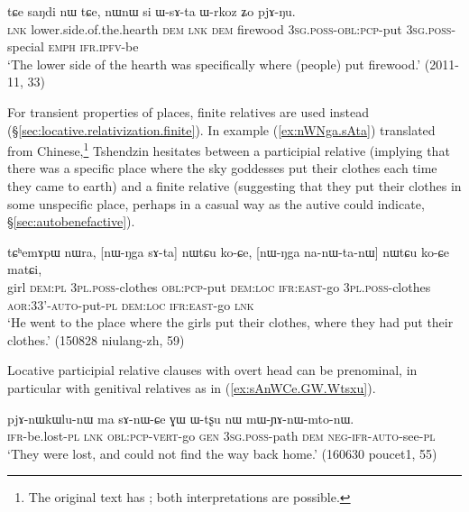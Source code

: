 \begin{exe}
\ex \label{ex:WsAta.Wrkoz}
\gll tɕe saŋdi nɯ tɕe, nɯnɯ si ɯ-sɤ-ta ɯ-rkoz ʑo pjɤ-ŋu. \\
  \textsc{lnk} lower.side.of.the.hearth \textsc{dem} \textsc{lnk} \textsc{dem} firewood \textsc{3sg}.\textsc{poss}-\textsc{obl}:\textsc{pcp}-put \textsc{3sg}.\textsc{poss}-special \textsc{emph} \textsc{ifr}.\textsc{ipfv}-be \\
\glt `The lower side of the hearth was specifically where (people) put firewood.' (2011-11, 33)
\end{exe}


For transient properties of places, finite relatives are used instead (§\ref{sec:locative.relativization.finite}). In example (\ref{ex:nWNga.sAta}) translated from Chinese,\footnote{The original text has ; both interpretations are possible. }  Tshendzin hesitates between a participial relative (implying that there was a specific place where the sky goddesses put their clothes each time they came to earth) and a finite relative (suggesting that they put their clothes in some unspecific place, perhaps in a casual way as the autive  could indicate, §\ref{sec:autobenefactive}).

\begin{exe}
\ex \label{ex:nWNga.sAta}
\gll tɕʰemɤpɯ nɯra, [nɯ-ŋga sɤ-ta] nɯtɕu ko-ɕe, [nɯ-ŋga na-nɯ-ta-nɯ] nɯtɕu ko-ɕe matɕi, \\
girl \textsc{dem}:\textsc{pl} \textsc{3pl}.\textsc{poss}-clothes \textsc{obl}:\textsc{pcp}-put \textsc{dem}:\textsc{loc} \textsc{ifr}:\textsc{east}-go \textsc{3pl}.\textsc{poss}-clothes \textsc{aor}:3\fl{}3'-\textsc{auto}-put-\textsc{pl} \textsc{dem}:\textsc{loc} \textsc{ifr}:\textsc{east}-go \textsc{lnk} \\
\glt `He went to the place where the girls put their clothes, where they had put their clothes.' (150828 niulang-zh, 59)
\end{exe}

Locative participial relative clauses with overt head can be prenominal, in particular with genitival relatives as in (\ref{ex:sAnWCe.GW.Wtsxu}). 

\begin{exe}
\ex \label{ex:sAnWCe.GW.Wtsxu}
\gll  pjɤ-nɯkɯlu-nɯ ma sɤ-nɯ-ɕe ɣɯ ɯ-tʂu nɯ mɯ-ɲɤ-nɯ-mto-nɯ. \\
\textsc{ifr}-be.lost-\textsc{pl}  \textsc{lnk} \textsc{obl}:\textsc{pcp}-\textsc{vert}-go \textsc{gen} \textsc{3sg}.\textsc{poss}-path \textsc{dem} \textsc{neg}-\textsc{ifr}-\textsc{auto}-see-\textsc{pl} \\
\glt `They were lost, and could not find the way back home.' (160630 poucet1, 55)
\end{exe}

